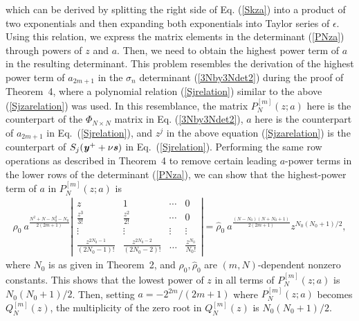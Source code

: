 \documentclass[amsmath,amssymb]{revtex4}
\begin{document}
which can be derived by splitting the right side of Eq. (\ref{Skza}) into a product of two exponentials and then expanding both exponentials into Taylor series of $\epsilon$. Using this relation, we express the matrix elements in the determinant (\ref{PNza}) through powers of $z$ and $a$. Then, we need to obtain the highest power term of $a$ in the resulting determinant. This problem resembles the derivation of the highest power term of $a_{2m+1}$ in the $\sigma_n$ determinant (\ref{3Nby3Ndet2}) during the proof of Theorem~4, where a polynomial relation (\ref{Sjrelation}) similar to the above (\ref{Sjzarelation}) was used. In this resemblance, the matrix $P^{[m]}_{N} (z; a)$ here is the counterpart of the $\Phi_{N\times N}$ matrix in Eq. (\ref{3Nby3Ndet2}), $a$ here is the counterpart of $a_{2m+1}$ in Eq.~(\ref{Sjrelation}), and $z^j$ in the above equation (\ref{Sjzarelation})
is the counterpart of $S_j(\textbf{\emph{y}}^{+}+\nu\textbf{\emph{s}})$ in Eq.~(\ref{Sjrelation}). Performing the same row operations as described in Theorem~4 to remove certain leading $a$-power terms in the lower rows of the determinant (\ref{PNza}), we can show that the highest-power term of $a$ in $P^{[m]}_{N}(z; a)$ is
\begin{eqnarray}
\rho_{0}\ a^{\frac{N^2+N-N_{0}^2-N_0}{2(2m+1)}} \left|\begin{array}{cccc}
 z & 1  & \cdots & 0\\
\frac{z^3}{3!} &  \frac{z^2}{2!} & \cdots & 0 \\
\vdots & \vdots & \vdots & \vdots \\
\frac{z^{2N_{0}-1}}{(2N_{0}-1)!}   & \frac{z^{2N_{0}-2}}{(2N_{0}-2)!}   & \ldots & \frac{z^{N_{0}}}{N_{0} !}
                 \end{array}
\right|=\hat{\rho}_{0}\  a^{\frac{(N-N_{0})(N+N_{0}+1)}{2(2m+1)}} z^{N_{0}(N_{0}+1)/2},
\end{eqnarray}
where $N_0$ is as given in Theorem~2, and $\rho_0, \hat{\rho}_{0}$ are $(m, N)$-dependent nonzero constants. This shows that the lowest power of $z$ in all terms of $P^{[m]}_{N} (z; a)$ is $N_{0}(N_{0}+1)/2$. Then, setting $a=-2^{2m}/(2m+1)$ where $P^{[m]}_{N} (z; a)$ becomes $Q_{N}^{[m]}(z)$, the multiplicity of the zero root in $Q_{N}^{[m]}(z)$ is $N_{0}(N_{0}+1)/2$.
\end{document}
